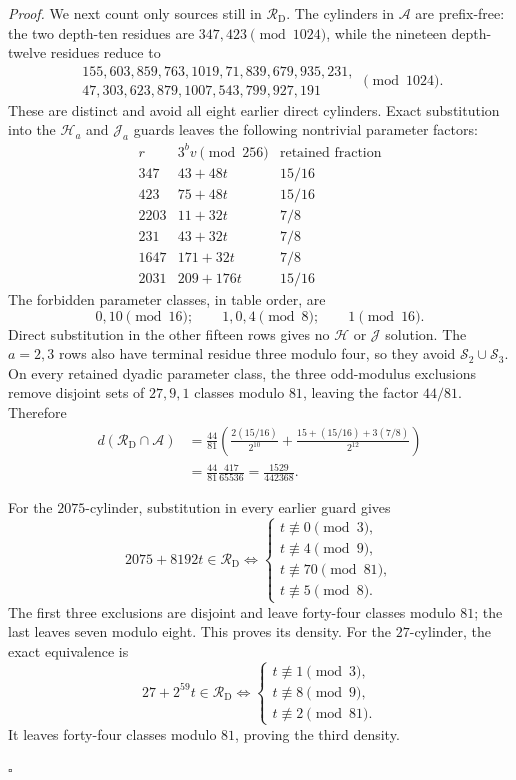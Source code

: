 \documentclass[11pt,letterpaper]{article}
\newenvironment{proof}{\noindent\textit{Proof.}}{\hfill\(\square\)}
\begin{document}
\begin{proof}
We next count only sources still in \(\mathcal R_{\mathrm D}\). The
cylinders in \(\mathcal A\) are prefix-free: the two depth-ten residues are
\(347,423\pmod{1024}\), while the nineteen depth-twelve residues reduce to
\[
\begin{gathered}
155,603,859,763,1019,71,839,679,935,231,\\
47,303,623,879,1007,543,799,927,191
\end{gathered}
\pmod{1024}.
\]
These are distinct and avoid all eight earlier direct cylinders. Exact
substitution into the \(\mathcal H_a\) and \(\mathcal J_a\) guards leaves
the following nontrivial parameter factors:
\[
\begin{array}{c|c|c}
r&3^bv\pmod{256}&\text{retained fraction}\\ \hline
347&43+48t&15/16\\
423&75+48t&15/16\\
2203&11+32t&7/8\\
231&43+32t&7/8\\
1647&171+32t&7/8\\
2031&209+176t&15/16
\end{array}
\]
The forbidden parameter classes, in table order, are
\[
0,10\pmod{16};\qquad1,0,4\pmod8;\qquad1\pmod{16}.
\]
Direct substitution in the other fifteen rows gives no \(\mathcal H\) or
\(\mathcal J\) solution. The \(a=2,3\) rows also have terminal residue
three modulo four, so they avoid \(\mathcal S_2\cup\mathcal S_3\).
On every retained dyadic parameter class, the three odd-modulus exclusions
remove disjoint sets of \(27,9,1\) classes modulo \(81\), leaving the factor
\(44/81\). Therefore
\[
\begin{aligned}
d(\mathcal R_{\mathrm D}\cap\mathcal A)
 &=\frac{44}{81}\left(
   \frac{2(15/16)}{2^{10}}
  +\frac{15+(15/16)+3(7/8)}{2^{12}}\right)\\
 &=\frac{44}{81}\frac{417}{65536}
 =\frac{1529}{442368}.
\end{aligned}
\]

For the \(2075\)-cylinder, substitution in every earlier guard gives
\[
2075+8192t\in\mathcal R_{\mathrm D}
\Longleftrightarrow
\begin{cases}
t\not\equiv0\pmod3,\\
t\not\equiv4\pmod9,\\
t\not\equiv70\pmod{81},\\
t\not\equiv5\pmod8.
\end{cases}
\]
The first three exclusions are disjoint and leave forty-four classes modulo
\(81\); the last leaves seven modulo eight. This proves its density.
For the \(27\)-cylinder, the exact equivalence is
\[
27+2^{59}t\in\mathcal R_{\mathrm D}
\Longleftrightarrow
\begin{cases}
t\not\equiv1\pmod3,\\
t\not\equiv8\pmod9,\\
t\not\equiv2\pmod{81}.
\end{cases}
\]
It leaves forty-four classes modulo \(81\), proving the third density.


\end{proof}
\end{document}
